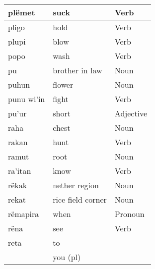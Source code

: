 \documentclass{article}
\begin{document}
\begin{longtable}{|l|l|l|}
plëmet                  & suck                & {\color[HTML]{009901} Verb}                        \\ \hline
pligo                   & hold                & {\color[HTML]{009901} Verb}                        \\ \hline
plupi                   & blow                & {\color[HTML]{009901} Verb}                        \\ \hline
popo                    & wash                & {\color[HTML]{009901} Verb}                        \\ \hline
pu                      & brother in law      & {\color[HTML]{009901} Noun}                        \\ \hline
puhun                   & flower              & {\color[HTML]{009901} Noun}                        \\ \hline
punu wi'in              & fight               & {\color[HTML]{009901} Verb}                        \\ \hline
pu'ur                   & short               & {\color[HTML]{009901} Adjective}                   \\ \hline
raha                    & chest               & {\color[HTML]{009901} Noun}                        \\ \hline
rakan                   & hunt                & {\color[HTML]{009901} Verb}                        \\ \hline
ramut                   & root                & {\color[HTML]{009901} Noun}                        \\ \hline
ra'itan                 & know                & {\color[HTML]{009901} Verb}                        \\ \hline
rëkak                   & nether region       & {\color[HTML]{009901} Noun}                        \\ \hline
rekat                   & rice field corner   & {\color[HTML]{009901} Noun}                        \\ \hline
rëmapira                & when                & {\color[HTML]{009901} Pronoun}                     \\ \hline
rëna                    & see                 & {\color[HTML]{009901} Verb}                        \\ \hline
reta                    & to                  & {\color[HTML]{009901} }                            \\ \hline
                        & you (pl)            & {\color[HTML]{009901} }                            \\ \cline{2-2}

\end{longtable}
\end{document}
